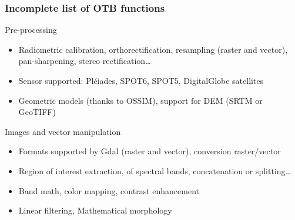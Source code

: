 \documentclass[8pt]{beamer}
\begin{document}
\begin{frame}
\frametitle{Incomplete list of OTB functions}

\begin{block}{Pre-processing}
\begin{itemize}
\item Radiometric calibration, orthorectification, resampling (raster and
  vector), pan-sharpening, stereo rectification\ldots
\item Sensor supported: Pléiades, SPOT6, SPOT5, DigitalGlobe satellites
\item Geometric models (thanks to OSSIM), support for DEM (SRTM or GeoTIFF)
\end{itemize}
\end{block}

\begin{block}{Images and vector manipulation}
\begin{itemize}
\item Formats supported by Gdal (raster and vector), conversion raster/vector
\item Region of interest extraction, of spectral bands, concatenation or splitting\ldots
\item Band math, color mapping, contrast enhancement
\item Linear filtering, Mathematical morphology
\end{itemize}
\end{block}
\end{frame}
\end{document}
